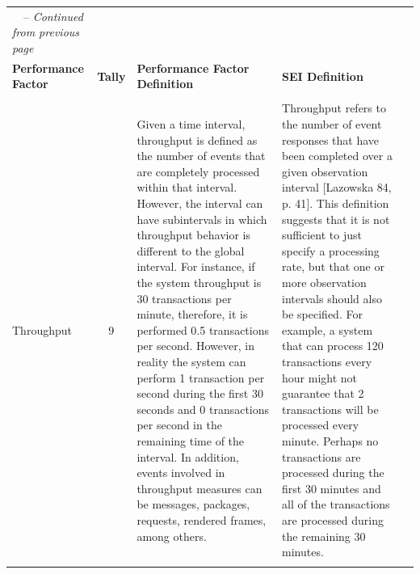 {\begin{longtable}[c]{|p{0.9in}|c|p{2.3in}|p{2.3in}|c}
	\hhline{|-|-|-|-|}
	\endfirsthead
	\multicolumn{4}{c}%
	{\tablename\ \thetable\ -- \textit{Continued from previous page}} \\
	\hhline{|-|-|-|-|}
	\centering\textbf{Performance Factor}     & \textbf{Tally} & \centering\textbf{Performance Factor Definition}                                                                                                                                                                                                                                                                                                                                                                                                                                                                                                                                                                                                                           & \centering\textbf{SEI Definition}                                                                                                                                                                                                                                                                                                                                                                                                                                                                                                                                                                                                                                                                                                                               &   \\
	\hhline{|-|-|-|-|}
	\endhead
	\hhline{|-|-|-|-|} \multicolumn{4}{r}{\textit{Continued on next page}} \\
	\endfoot
	\hhline{|-|-|-|-|}
	\endlastfoot
	\centering	Throughput                     & 9              & Given   a time interval, throughput is defined as the number of events that are completely processed within that interval. However, the interval can have   subintervals in which throughput behavior is different to the global   interval. For instance, if the system throughput is 30 transactions per   minute, therefore, it is performed 0.5 transactions per second. However, in reality the system can perform 1 transaction per second during the first 30 seconds and 0 transactions per second in the remaining time of the interval. In addition, events involved in throughput measures can be messages, packages, requests,   rendered frames, among others. & Throughput   refers to the number of event responses that have been completed over a given   observation interval {[}Lazowska 84, p. 41{]}. This definition suggests that it   is not sufficient to just specify a processing rate, but that one or more   observation intervals should also be specified. For example, a system that   can process 120 transactions every hour might not guarantee that 2   transactions will be processed every minute. Perhaps no transactions are   processed during the first 30 minutes and all of the transactions are   processed during the remaining 30 minutes.                           &   \\ \hhline{|-|-|-|-|}

\end{longtable}}
